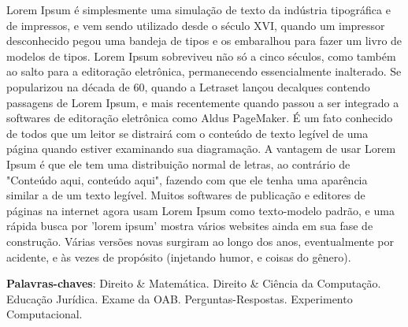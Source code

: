 
Lorem Ipsum é simplesmente uma simulação de texto da indústria tipográfica e de impressos, e vem sendo utilizado desde o século XVI, quando um impressor desconhecido pegou uma bandeja de tipos e os embaralhou para fazer um livro de modelos de tipos. Lorem Ipsum sobreviveu não só a cinco séculos, como também ao salto para a editoração eletrônica, permanecendo essencialmente inalterado. Se popularizou na década de 60, quando a Letraset lançou decalques contendo passagens de Lorem Ipsum, e mais recentemente quando passou a ser integrado a softwares de editoração eletrônica como Aldus PageMaker.
É um fato conhecido de todos que um leitor se distrairá com o conteúdo de texto legível de uma página quando estiver examinando sua diagramação. A vantagem de usar Lorem Ipsum é que ele tem uma distribuição normal de letras, ao contrário de "Conteúdo aqui, conteúdo aqui", fazendo com que ele tenha uma aparência similar a de um texto legível. Muitos softwares de publicação e editores de páginas na internet agora usam Lorem Ipsum como texto-modelo padrão, e uma rápida busca por 'lorem ipsum' mostra vários websites ainda em sua fase de construção. Várias versões novas surgiram ao longo dos anos, eventualmente por acidente, e às vezes de propósito (injetando humor, e coisas do gênero).

 \textbf{Palavras-chaves}: Direito \& Matemática. Direito \& Ciência da Computação. Educação Jurídica. Exame da OAB. Perguntas-Respostas. Experimento Computacional.